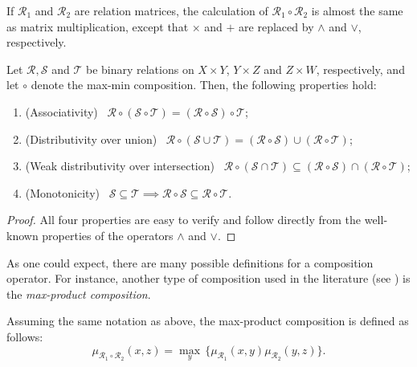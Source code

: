 \begin{remark} If $\mathcal R_1$ and $\mathcal R_2$ are relation matrices, the calculation of $\mathcal R_1 \circ \mathcal R_2$ is almost the same as matrix multiplication, except that $\times$ and $+$ are replaced by $\land$ and $\lor$, respectively.

\end{remark}

\begin{prop} Let $\mathcal R, \mathcal S$ and $\mathcal T$ be binary relations on $X \times Y$, $Y \times Z$ and $Z \times W$, respectively, and let $\circ$ denote the max-min composition. Then, the following properties hold:

\begin{enumerate}
\item (Associativity) \ $\mathcal R \circ (\mathcal S \circ \mathcal T) = (\mathcal R \circ \mathcal S) \circ \mathcal T$;
\item (Distributivity  over union) \ $\mathcal R \circ (\mathcal S \cup \mathcal T) = (\mathcal R \circ \mathcal S) \cup (\mathcal R \circ \mathcal T)$;
\item (Weak distributivity over intersection) \ $\mathcal R \circ (\mathcal S \cap \mathcal T) \subseteq (\mathcal R \circ \mathcal S) \cap (\mathcal R \circ \mathcal T)$;
\item (Monotonicity) \ $\mathcal S \subseteq \mathcal T \implies \mathcal R \circ \mathcal S \subseteq \mathcal R \circ \mathcal T$.
\end{enumerate}

\end{prop}

\begin{proof}
  All four properties are easy to verify and follow directly from the well-known properties of the operators $\land$ and $\lor$.
\end{proof}

As one could expect, there are many possible definitions for a composition operator. For instance, another type of composition used in the literature (see \cite{markovsii2004solution, loetamonphong2001optimization}) is the \textit{max-product composition}.

\begin{definition} Assuming the same notation as above, the max-product composition is defined as follows:
\[
\mu_{\mathcal R_1 \circ \mathcal R_2}(x,z) = \max_{y} \, \{ \mu_{\mathcal R_1}(x,y) \mu_{\mathcal R_2}(y,z) \}.
\]

\end{definition}

